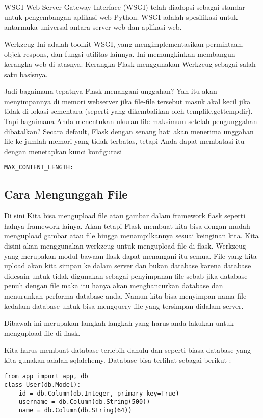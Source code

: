 \documentclass[12pt,a4paper]{article}
\begin{document}
WSGI
Web Server Gateway Interface (WSGI) telah diadopsi sebagai standar untuk pengembangan aplikasi web Python. WSGI adalah spesifikasi untuk antarmuka universal antara server web dan aplikasi web.

Werkzeug
Ini adalah toolkit WSGI, yang mengimplementasikan permintaan, objek respons, dan fungsi utilitas lainnya. Ini memungkinkan membangun kerangka web di atasnya. Kerangka Flask menggunakan Werkzeug sebagai salah satu basisnya.

Jadi bagaimana tepatnya Flask menangani unggahan? Yah itu akan menyimpannya di memori webserver jika file-file tersebut masuk akal kecil jika tidak di lokasi sementara (seperti yang dikembalikan oleh tempfile.gettempdir). Tapi bagaimana Anda menentukan ukuran file maksimum setelah pengunggahan dibatalkan? Secara default, Flask dengan senang hati akan menerima unggahan file ke jumlah memori yang tidak terbatas, tetapi Anda dapat membatasi itu dengan menetapkan kunci konfigurasi 

\begin{verbatim}
MAX_CONTENT_LENGTH:
\end{verbatim}

\subsection{Cara Mengunggah File}


Di sini Kita bisa mengupload file atau gambar dalam framework flask seperti halnya framework lainya. Akan tetapi Flask membuat kita bisa dengan mudah mengupload gambar atau file hingga menampilkannya sesuai keinginan kita. Kita disini akan menggunakan werkzeug untuk mengupload file di flask. Werkzeug yang merupakan modul bawaan flask dapat menangani itu semua.
File yang kita upload akan kita simpan ke dalam server dan bukan database karena database didesain untuk tidak digunakan sebagai penyimpanan file sebab jika database penuh dengan file maka itu hanya akan menghancurkan database dan menurunkan performa database anda. Namun kita bisa menyimpan nama file kedalam database untuk bisa mengquery file yang tersimpan didalam server.

Dibawah ini merupakan langkah-langkah yang harus anda lakukan untuk mengupload file di flask.

Kita harus membuat database terlebih dahulu dan seperti biasa database yang kita gunakan adalah sqlalchemy. Database bisa terlihat sebagai berikut :

\begin{verbatim}
from app import app, db
class User(db.Model):
    id = db.Column(db.Integer, primary_key=True)
    username = db.Column(db.String(500))
    name = db.Column(db.String(64))
\end{verbatim}
\end{document}

